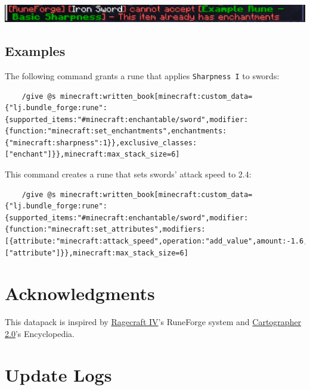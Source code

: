 \documentclass[11pt]{article}
\begin{document}
\begin{center}
  \includegraphics[width=6in]{Screenshot from 2025-04-04 23-39-41.png}
\end{center}

\subsection{Examples}

The following command grants a rune that applies {\small\tt Sharpness I} to swords:

\lstset{
  breaklines=true,
  basicstyle=\ttfamily\small,
  keepspaces=true,
  showspaces=false
}
\begin{lstlisting}
    /give @s minecraft:written_book[minecraft:custom_data={"lj.bundle_forge:rune":{supported_items:"#minecraft:enchantable/sword",modifier:{function:"minecraft:set_enchantments",enchantments:{"minecraft:sharpness":1}},exclusive_classes:["enchant"]}},minecraft:max_stack_size=6]
\end{lstlisting}

This command creates a rune that sets swords' attack speed to 2.4:

\begin{lstlisting}
    /give @s minecraft:written_book[minecraft:custom_data={"lj.bundle_forge:rune":{supported_items:"#minecraft:enchantable/sword",modifier:{function:"minecraft:set_attributes",modifiers:[{attribute:"minecraft:attack_speed",operation:"add_value",amount:-1.6,id:"minecraft:base_attack_speed",slot:"mainhand"}],replace:false},exclusive_classes:["attribute"]}},minecraft:max_stack_size=6]
\end{lstlisting}

\section*{Acknowledgments} %
This datapack is inspired by \href{https://ctmrepository.com/index.php?action=viewMap&id=588}{Ragecraft IV}'s RuneForge system and \href{https://github.com/pearuhdox/Cartographer-2.0}{Cartographer 2.0}'s Encyclopedia.

\appendix

\section{Update Logs}
\end{document}
